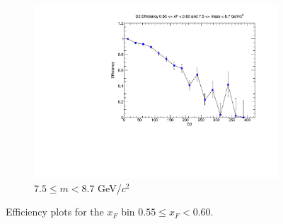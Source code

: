 \documentclass[11pt]{article}
\begin{document}
\begin{figure}[p]
\begin{subfigure}[b]{0.32\textwidth}
        \includegraphics[width=\textwidth]{./kTrackerEfficiencyPlots/D2_Efficiency_xF11_mass10.pdf}
        \caption{$7.5 \leq m < 8.7$ GeV/$c^2$}
    \end{subfigure}
    \caption{Efficiency plots for the $x_F$ bin $0.55 \leq x_F < 0.60$.}
\end{figure}
\end{document}
